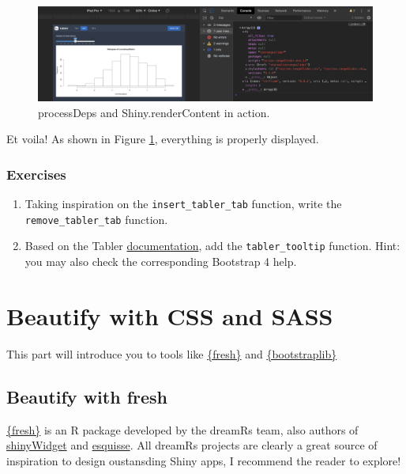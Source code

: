 \documentclass[
]{book}
\providecommand{\tightlist}{%
  \setlength{\itemsep}{0pt}\setlength{\parskip}{0pt}}
\begin{document}
\begin{figure}
\includegraphics[width=36.03in]{images/practice/process-deps} \caption{processDeps and Shiny.renderContent in action.}\label{fig:process-deps}
\end{figure}

Et voila! As shown in Figure \ref{fig:process-deps}, everything is properly displayed.

\hypertarget{exercises-2}{%
\section{Exercises}\label{exercises-2}}

\begin{enumerate}
\def\labelenumi{\arabic{enumi}.}
\tightlist
\item
  Taking inspiration on the \texttt{insert\_tabler\_tab} function, write the \texttt{remove\_tabler\_tab} function.
\item
  Based on the Tabler \href{https://preview-dev.tabler.io/docs/tooltips.html}{documentation}, add the \texttt{tabler\_tooltip} function. Hint: you may also check the corresponding Bootstrap 4 help.
\end{enumerate}

\hypertarget{part-beautify-with-css-and-sass}{%
\part*{Beautify with CSS and SASS}\label{part-beautify-with-css-and-sass}}

This part will introduce you to tools like \href{https://dreamrs.github.io/fresh/index.html}{\{fresh\}} and \href{https://rstudio.github.io/bootstraplib/index.html}{\{bootstraplib\}}

\hypertarget{beautify-with-fresh}{%
\chapter{Beautify with fresh}\label{beautify-with-fresh}}

\href{https://github.com/dreamRs/fresh}{\{fresh\}} is an R package developed by the dreamRs team, also authors of \href{https://github.com/dreamRs/shinyWidgets}{shinyWidget} and \href{https://github.com/dreamRs/esquisse}{esquisse}. All dreamRs projects are clearly a great source of inspiration to design oustansding Shiny apps, I recommend the reader to explore!
\end{document}
